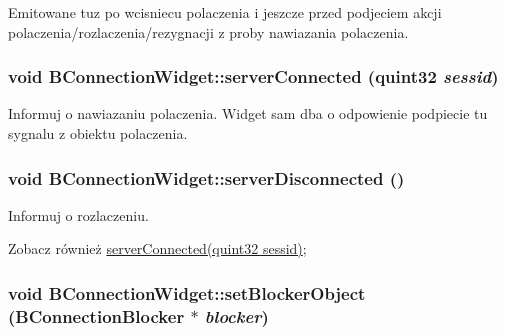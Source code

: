 Emitowane tuz po wcisniecu polaczenia i jeszcze przed podjeciem akcji polaczenia/rozlaczenia/rezygnacji z proby nawiazania polaczenia. \hypertarget{class_b_connection_widget_a7c9d3a266939c6719fe198f9b3d67636}{
\subsubsection[{serverConnected}]{\setlength{\rightskip}{0pt plus 5cm}void BConnectionWidget::serverConnected (quint32 {\em sessid})}}
\label{class_b_connection_widget_a7c9d3a266939c6719fe198f9b3d67636}


Informuj o nawiazaniu polaczenia. Widget sam dba o odpowienie podpiecie tu sygnalu z obiektu polaczenia. \hypertarget{class_b_connection_widget_a159829b06e46c68a354ec999d4b15b61}{
\subsubsection[{serverDisconnected}]{\setlength{\rightskip}{0pt plus 5cm}void BConnectionWidget::serverDisconnected ()}}
\label{class_b_connection_widget_a159829b06e46c68a354ec999d4b15b61}


Informuj o rozlaczeniu. \begin{DoxySeeAlso}{Zobacz również}
\hyperlink{class_b_connection_widget_a7c9d3a266939c6719fe198f9b3d67636}{serverConnected(quint32 sessid)}; 
\end{DoxySeeAlso}
\hypertarget{class_b_connection_widget_a976657d9910495a76d16b7c90d0b54fc}{
\subsubsection[{setBlockerObject}]{\setlength{\rightskip}{0pt plus 5cm}void BConnectionWidget::setBlockerObject ({\bf BConnectionBlocker} $\ast$ {\em blocker})}}
\label{class_b_connection_widget_a976657d9910495a76d16b7c90d0b54fc}


